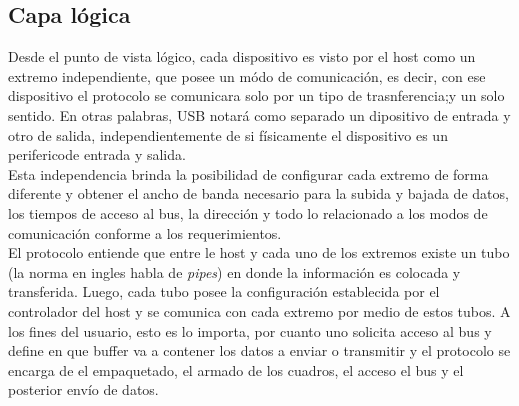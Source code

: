 \subsection{Capa lógica}
	Desde el punto de vista lógico, cada dispositivo es visto por el host como un extremo independiente, que posee un módo de comunicación, es decir, con ese dispositivo el protocolo se comunicara solo por un tipo de trasnferencia;y un solo sentido. En otras palabras, USB notará como separado un dipositivo de entrada y otro de salida, independientemente de si físicamente el dispositivo es un perifericode entrada y salida.\\
	
	Esta independencia brinda la posibilidad de configurar cada extremo de forma diferente y obtener el ancho de banda necesario para la subida y bajada de datos, los tiempos de acceso al bus, la dirección y todo lo relacionado a los modos de comunicación conforme a los requerimientos.\\
	
	El protocolo entiende que entre le host y cada uno de los extremos existe un tubo (la norma en ingles habla de {\it pipes}) en donde la información es colocada y transferida. Luego, cada tubo posee la configuración establecida por el controlador del host y se comunica con cada extremo por medio de estos tubos. A los fines del usuario, esto es lo importa, por cuanto uno solicita acceso al bus y define en que buffer va a contener los datos a enviar o transmitir y el protocolo se encarga de el empaquetado, el armado de los cuadros, el acceso el bus y el posterior envío de datos.\\
